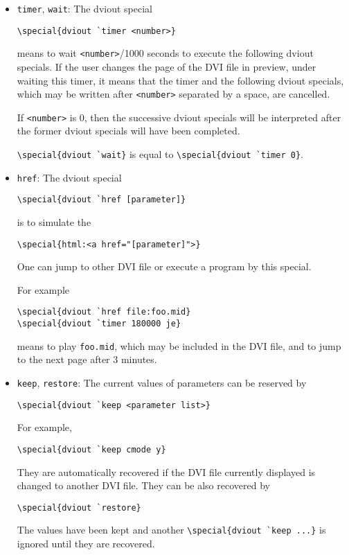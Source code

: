 \documentclass{article}
\begin{document}
\begin{itemize}
\item {\tt timer}, {\tt wait}:
The dviout special
\begin{verbatim}
\special{dviout `timer <number>}
\end{verbatim}
means to wait {\tt <number>}/1000 seconds to execute the following
dviout specials.  If the user changes the page of the DVI file in preview,
under waiting this timer, it means that the timer and the following dviout 
specials, which may be written after {\tt <number>} separated by a space, 
are cancelled.

If {\tt <number>} is 0, then the successive dviout specials will be interpreted
after the former dviout specials will have been completed.  

\verb|\special{dviout `wait}| is equal to \verb|\special{dviout `timer 0}|. 

\item {\tt href}:
The dviout special
\begin{verbatim}
\special{dviout `href [parameter]}
\end{verbatim}
is to simulate the 
\begin{verbatim}
\special{html:<a href="[parameter]">}
\end{verbatim}
One can jump to other DVI file or execute a program by this special.

For example
\begin{verbatim}
\special{dviout `href file:foo.mid}
\special{dviout `timer 180000 je}
\end{verbatim}
means to play {\tt foo.mid}, which may be included in the DVI file,
and to jump to the next page after 3 minutes.

\item {\tt keep}, {\tt restore}:
The current values of parameters can be reserved by
\begin{verbatim}
\special{dviout `keep <parameter list>}
\end{verbatim}
For example,
\begin{verbatim}
\special{dviout `keep cmode y}
\end{verbatim}
They are automatically recovered if the DVI file currently displayed is 
changed to another DVI file. 
They can be also recovered by
\begin{verbatim}
\special{dviout `restore}
\end{verbatim}
The values have been kept and another \verb|\special{dviout `keep ...}| 
is ignored until they are recovered.


\end{itemize}
\end{document}
